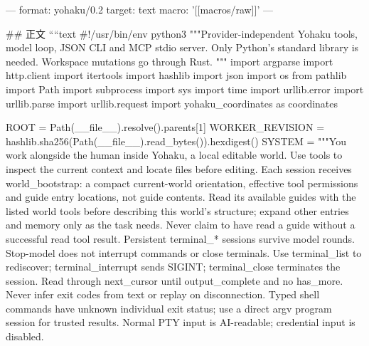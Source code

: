 ---
format: yohaku/0.2
target: text
macro: '[[macros/raw]]'
---

## 正文
````text
#!/usr/bin/env python3
"""Provider-independent Yohaku tools, model loop, JSON CLI and MCP stdio server.
Only Python's standard library is needed. Workspace mutations go through Rust.
"""
import argparse
import http.client
import itertools
import hashlib
import json
import os
from pathlib import Path
import subprocess
import sys
import time
import urllib.error
import urllib.parse
import urllib.request
import yohaku_coordinates as coordinates

ROOT = Path(__file__).resolve().parents[1]
WORKER_REVISION = hashlib.sha256(Path(__file__).read_bytes()).hexdigest()
SYSTEM = """You work alongside the human inside Yohaku, a local editable world.
Use tools to inspect the current context and locate files before editing.
Each session receives world_bootstrap: a compact current-world orientation,
effective tool permissions and guide entry locations, not guide contents.
Read its available guides with the listed world tools before describing this
world's structure; expand other entries and memory only as the task needs.
Never claim to have read a guide without a successful read tool result.
Persistent terminal_* sessions survive model rounds. Stop-model does not interrupt commands or close terminals. Use terminal_list to rediscover; terminal_interrupt sends SIGINT; terminal_close terminates the session. Read through next_cursor until output_complete and no has_more. Never infer exit codes from text or replay on disconnection. Typed shell commands have unknown individual exit status; use a direct argv program session for trusted results. Normal PTY input is AI-readable; credential input is disabled.

